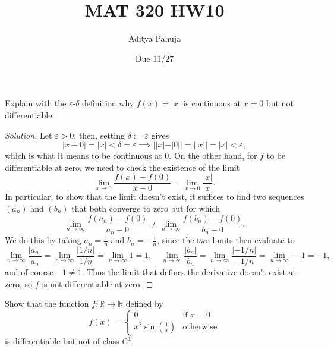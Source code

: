 \documentclass[11pt]{scrartcl}
\title{\vspace{-2em}MAT 320 HW10}
\author{\large Aditya Pahuja}
\date{\large Due 11/27}
\providecommand{\eps}{\varepsilon}
\providecommand{\RR}{\mathbb R}
\newenvironment{soln}{\begin{proof}[Solution]}{\end{proof}}
\begin{document}
\maketitle

\begin{problem}
	Explain with the $\eps$-$\delta$ definition why
	$f(x) = |x|$ is continuous at $x = 0$ but not differentiable.
\end{problem}

\begin{soln}
	Let $\eps > 0$; then, setting $\delta := \eps$ gives
	\[|x - 0| = |x| < \delta = \eps \implies ||x| - |0|| = ||x|| = |x| < \eps,\]
	which is what it means to be continuous at $0$.
	On the other hand, for $f$ to be differentiable at zero,
	we need to check the existence of the limit
	\[\lim_{x\to0} \frac{f(x) - f(0)}{x - 0}
	= \lim_{x\to0} \frac{|x|}{x}.\]
	In particular, to show that the limit doesn't exist,
	it suffices to find two sequences $(a_n)$ and $(b_n)$
	that both converge to zero but for which
	\[\lim_{n\to\infty} \frac{f(a_n) - f(0)}{a_n - 0}
	\ne \lim_{n\to\infty} \frac{f(b_n) - f(0)}{b_n - 0}.\]
	We do this by taking $a_n = \frac 1n$ and $b_n = -\frac 1n$, since
	the two limits then evaluate to
	\[\lim_{n\to\infty} \frac{|a_n|}{a_n} =
	\lim_{n\to\infty} \frac{|1/n|}{1/n} = \lim_{n\to\infty}1 = 1,\quad
	\lim_{n\to\infty} \frac{|b_n|}{b_n} =
	\lim_{n\to\infty} \frac{|-1/n|}{-1/n} = \lim_{n\to\infty}-1 = -1,\]
	and of course $-1\ne 1$. Thus the limit that defines the derivative
	doesn't exist at zero, so $f$ is not differentiable at zero.
\end{soln}

\begin{problem}
	Show that the function $f\colon\RR\to\RR$ defined by
	\[f(x) = \begin{cases}
		0 & \text{if }x = 0\\
		x^2\sin(\frac1x)&\text{otherwise}
	\end{cases}\]
	is differentiable but not of class $C^1$.
\end{problem}
\end{document}
